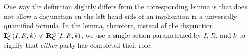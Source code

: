 
One way the definition slightly differs from the corresponding \mTamarin{} lemma
is that \mTamarin{} does not allow a disjunction on the left hand side of an
implication in a universally quantified formula.
%
In the lemma, therefore, instead of the disjunction
$\mathbf{I}_{\textsf{C}}^{t_2}(I, R, k)\, \lor\,  \mathbf{R}_{\textsf{C}}^{t_2}(I, R, k)$,
we use a single action parametrized by $I$, $R$, and $k$ to signify that
\emph{either} party has completed their role. \\
%
